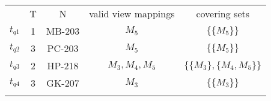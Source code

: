 \begin{example}
\begin{table}[htp]
\begin{tabular}[t]{c|c|c||c|c|} \hhline{~----}
&T&N&valid view mappings&covering sets\\ \hhline{~----}
$t_{q1}$&1&MB-203&$M_5$&$\{\{M_5\}\}$\\ \hhline{~----}
$t_{q2}$&3&PC-203&$M_5$&$\{\{M_5\}\}$\\ \hhline{~----}
$t_{q3}$&2&HP-218&$M_3, M_4, M_5$&$\{\{M_3\}, \{M_4, M_5\}\}$\\ \hhline{~----}
$t_{q4}$&3&GK-207&$M_3$&$\{\{M_3\}\}$\\ \hhline{~----}
\end{tabular}
\end{table}








\end{example}
